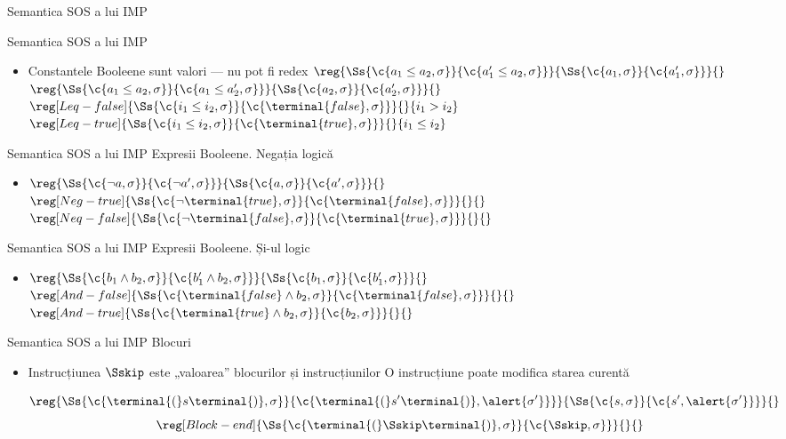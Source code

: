 \documentclass[xcolor=pdftex,romanian,colorlinks]{beamer}
\begin{document}
\begin{section}{Semantica SOS a lui IMP}
\begin{frame}{Semantica SOS a lui IMP}
\begin{itemize}
  \item Constantele Booleene sunt valori --- nu pot fi redex
  \vitem[] $\reg{\Ss{\c{a_1 \leq a_2,\sigma}}{\c{a_1' \leq a_2,\sigma}}}{\Ss{\c{a_1,\sigma}}{\c{a_1',\sigma}}}{}$\hfill$\reg{\Ss{\c{a_1 \leq a_2,\sigma}}{\c{a_1 \leq a_2',\sigma}}}{\Ss{\c{a_2,\sigma}}{\c{a_2',\sigma}}}{}$
  \vitem[] $\reg[Leq-false]{\Ss{\c{i_1 \leq i_2,\sigma}}{\c{\terminal{false},\sigma}}}{}{i_1 > i_2}$
  \vitem[] $\reg[Leq-true]{\Ss{\c{i_1 \leq i_2,\sigma}}{\c{\terminal{true},\sigma}}}{}{i_1 \leq i_2}$
  \end{itemize}
  \end{frame}
  \begin{frame}{Semantica SOS a lui IMP}
  {Expresii Booleene. Negația logică}
  \begin{itemize}
  \item[] $\reg{\Ss{\c{\neg a,\sigma}}{\c{\neg a',\sigma}}}{\Ss{\c{a,\sigma}}{\c{a',\sigma}}}{}$
  \vitem[] $\reg[Neg-true]{\Ss{\c{\neg \terminal{true},\sigma}}{\c{\terminal{false},\sigma}}}{}{}$
  \vitem[] $\reg[Neq-false]{\Ss{\c{\neg \terminal{false},\sigma}}{\c{\terminal{true},\sigma}}}{}{}$
  \end{itemize}
  \end{frame}
  \begin{frame}{Semantica SOS a lui IMP}
  {Expresii Booleene. Și-ul logic}
  \begin{itemize}
  \item[] $\reg{\Ss{\c{b_1 \wedge b_2,\sigma}}{\c{b_1' \wedge b_2,\sigma}}}{\Ss{\c{b_1,\sigma}}{\c{b_1',\sigma}}}{}$
  \vitem[] $\reg[And-false]{\Ss{\c{{\terminal{false}} \wedge b_2,\sigma}}{\c{\terminal{false},\sigma}}}{}{}$
  \vitem[] $\reg[And-true]{\Ss{\c{{\terminal{true}} \wedge b_2,\sigma}}{\c{b_2,\sigma}}}{}{}$
  \end{itemize}
  \end{frame}
  \begin{frame}{Semantica SOS a lui IMP}
  {Blocuri}
  \begin{itemize}
  \item Instrucțiunea $\Sskip$ este „valoarea” blocurilor și instrucțiunilor
  \vitem O instrucțiune poate modifica starea curentă

  \[\reg{\Ss{\c{\terminal{(} s \terminal{)},\sigma}}{\c{\terminal{(} s' \terminal{)},\alert{\sigma'}}}}{\Ss{\c{s,\sigma}}{\c{s',\alert{\sigma'}}}}{}\]
  \vitem[] \[\reg[Block-end]{\Ss{\c{\terminal{(} \Sskip \terminal{)},\sigma}}{\c{\Sskip,\sigma}}}{}{}\]
  \end{itemize}
  \end{frame}


\end{section}
\end{document}
